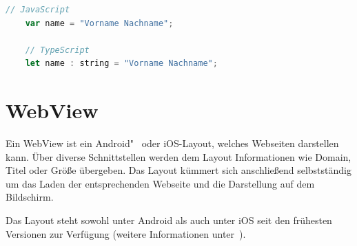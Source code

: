 \begin{lstlisting}[language=JavaScript, caption=Unterschied zwischen JavaScript und TypeScript, label=ls:grundlagen_typescript]
    // JavaScript
    var name = "Vorname Nachname";

    // TypeScript
    let name : string = "Vorname Nachname";
\end{lstlisting}

\section{WebView}
Ein WebView ist ein Android"~ oder iOS-Layout, welches Webseiten darstellen kann. Über diverse Schnittstellen werden dem
Layout Informationen wie Domain, Titel oder Größe übergeben. Das Layout kümmert sich anschließend selbstständig um das
Laden der entsprechenden Webseite und die Darstellung auf dem Bildschirm.

Das Layout steht sowohl unter Android als auch unter iOS seit den frühesten Versionen zur Verfügung (weitere
Informationen unter~\cite{online_grundlagen_webview}).
